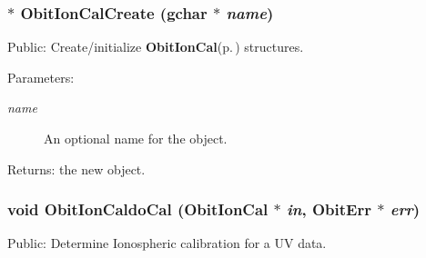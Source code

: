 \subsubsection{$\ast$ Obit\-Ion\-Cal\-Create (gchar $\ast$ {\em name})}\label{ObitIonCal_8h_a6}


Public: Create/initialize {\bf Obit\-Ion\-Cal}{\rm (p.\,\pageref{structObitIonCal})} structures. 

\begin{Desc}
\item[Parameters:]
\begin{description}
\item[{\em name}]An optional name for the object. \end{description}
\end{Desc}
\begin{Desc}
\item[Returns:]the new object. \end{Desc}
\subsubsection{\setlength{\rightskip}{0pt plus 5cm}void Obit\-Ion\-Caldo\-Cal ({\bf Obit\-Ion\-Cal} $\ast$ {\em in}, {\bf Obit\-Err} $\ast$ {\em err})}\label{ObitIonCal_8h_a14}


Public: Determine Ionospheric calibration for a UV data. 


